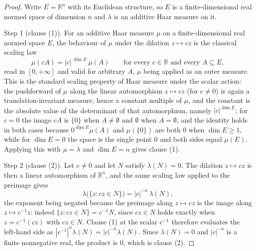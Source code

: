 \begin{proof}
Write $E = \mathbb{R}^n$ with its Euclidean structure, so $E$ is a
finite-dimensional real normed space of dimension $n$ and $\lambda$ is an
additive Haar measure on it.

Step 1 (clause (1)).  For an additive Haar measure $\mu$ on a finite-dimensional
real normed space $E$, the behaviour of $\mu$ under the dilation $z \mapsto cz$
is the classical scaling law
\[
  \mu(cA) = |c|^{\,\dim E}\,\mu(A)
  \qquad\text{for every } c \in \mathbb{R}
  \text{ and every } A \subseteq E ,
\]
read in $[0,+\infty]$ and valid for arbitrary $A$, $\mu$ being applied as an
outer measure.  This is the standard scaling property of Haar measure under the
scalar action: the pushforward of $\mu$ along the linear automorphism
$z \mapsto cz$ (for $c \neq 0$) is again a translation-invariant measure, hence
a constant multiple of $\mu$, and the constant is the absolute value of the
determinant of that automorphism, namely $|c|^{\dim E}$; for $c = 0$ the image
$cA$ is $\{0\}$ when $A \neq \emptyset$ and $\emptyset$ when $A = \emptyset$,
and the identity holds in both cases because $0^{\dim E}\mu(A)$ and
$\mu(\{0\})$ are both $0$ when $\dim E \geq 1$, while for $\dim E = 0$ the space
is the single point $0$ and both sides equal $\mu(E)$.  Applying this with
$\mu = \lambda$ and $\dim E = n$ gives clause (1).

Step 2 (clause (2)).  Let $c \neq 0$ and let $N$ satisfy $\lambda(N) = 0$.  The
dilation $z \mapsto cz$ is then a linear automorphism of $\mathbb{R}^n$, and the
same scaling law applied to the preimage gives
\[
  \lambda\bigl(\{z : cz \in N\}\bigr) = |c|^{-n}\,\lambda(N) ,
\]
the exponent being negated because the preimage along $z \mapsto cz$ is the
image along $z \mapsto c^{-1}z$: indeed $\{z : cz \in N\} = c^{-1}N$, since
$cz \in N$ holds exactly when $z = c^{-1}(cz)$ with $cz \in N$.  Clause (1) at
the scalar $c^{-1}$ therefore evaluates the left-hand side as
$|c^{-1}|^n\lambda(N) = |c|^{-n}\lambda(N)$.  Since $\lambda(N) = 0$ and
$|c|^{-n}$ is a finite nonnegative real, the product is $0$, which is clause
(2).
\end{proof}

